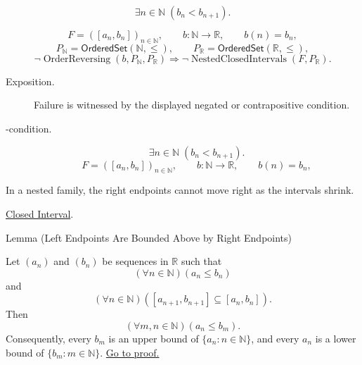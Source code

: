 \begin{remark*}
\[
\exists n\in\mathbb{N}\;(b_n<b_{n+1}).
\]
\end{remark*}

\begin{remark*}
\[
F=([a_n,b_n])_{n\in\mathbb{N}},\qquad
b\colon\mathbb{N}\longrightarrow\mathbb{R},\qquad b(n)=b_n,
\]
\[
P_{\mathbb{N}}=\mathsf{OrderedSet}(\mathbb{N},\leq),\qquad
P_{\mathbb{R}}=\mathsf{OrderedSet}(\mathbb{R},\leq),
\]
\[
\neg\operatorname{OrderReversing}(b,P_{\mathbb{N}},P_{\mathbb{R}})
\Longrightarrow
\neg\operatorname{NestedClosedIntervals}(F,P_{\mathbb{R}}).
\]
\end{remark*}

\begin{remark*}
\begin{description}
  \item[Exposition.]
  Failure is witnessed by the displayed negated or contrapositive condition.

  \item[\exists-condition.]
  \[
\exists n\in\mathbb{N}\;(b_n<b_{n+1}).
\]
\[
F=([a_n,b_n])_{n\in\mathbb{N}},\qquad
b\colon\mathbb{N}\longrightarrow\mathbb{R},\qquad b(n)=b_n,
\]
\end{description}
\end{remark*}

\begin{remark*}[Interpretation]
In a nested family, the right endpoints cannot move right as the intervals
shrink.
\end{remark*}

\begin{dependencies}
\hyperref[def:closed-interval]{Closed Interval}.
\end{dependencies}

\begin{lemmabox}{Lemma (Left Endpoints Are Bounded Above by Right Endpoints)}
\begin{lemma}
\label{lem:left-endpoints-bounded-above-by-right-endpoints}
Let $(a_n)$ and $(b_n)$ be sequences in $\mathbb{R}$ such that
\[
  (\forall n\in\mathbb{N})(a_n\leq b_n)
\]
and
\[
  (\forall n\in\mathbb{N})([a_{n+1},b_{n+1}]\subseteq [a_n,b_n]).
\]
Then
\[
  (\forall m,n\in\mathbb{N})(a_n\leq b_m).
\]
Consequently, every $b_m$ is an upper bound of $\{a_n:n\in\mathbb{N}\}$, and
every $a_n$ is a lower bound of $\{b_m:m\in\mathbb{N}\}$.
\hyperref[prf:left-endpoints-bounded-above-by-right-endpoints]{Go to proof.}
\end{lemma}
\end{lemmabox}

